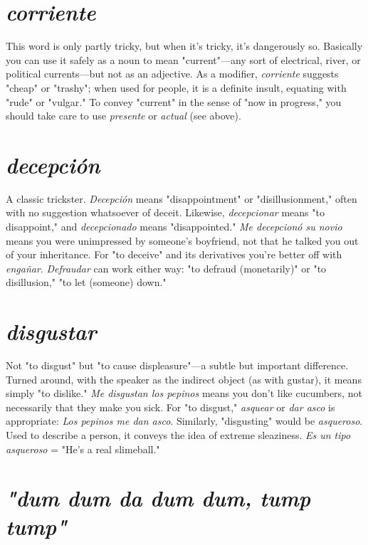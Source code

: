 \documentclass[14pt,a4paper,oneside]{memoir}
\begin{document}
\section{\emph{corriente}}

This word is only partly tricky, but when it's
tricky, it's dangerously so. Basically you can use it safely as a noun to
mean "current"---any sort of electrical, river, or political currents---but not as an adjective. As a modifier, \emph{corriente} suggests "cheap" or
"trashy"; when used for people, it is a definite insult, equating with
"rude" or "vulgar." To convey "current" in the sense of "now in progress," you should take care to use \emph{presente} or \emph{actual} (see above).

\section{\emph{decepción}}

A classic trickster. \emph{Decepción} means "disappointment" or "disillusionment," often with no suggestion whatsoever
of deceit. Likewise, \emph{decepcionar} means "to disappoint," and \emph{decepcionado} means "disappointed." \emph{Me decepcionó su novio} means you
were unimpressed by someone's boyfriend, not that he talked you out
of your inheritance. For "to deceive" and its derivatives you're better
off with \emph{engañar}. \emph{Defraudar} can work either way: "to defraud (monetarily)" or "to disillusion," "to let (someone) down."

\section{\emph{disgustar}}

Not "to disgust" but "to cause displeasure"---a
subtle but important difference. Turned around, with the speaker as
the indirect object (as with gustar), it means simply "to dislike." \emph{Me
	disgustan los pepinos} means you don't like cucumbers, not necessarily
that they make you sick. For "to disgust," \emph{asquear} or \emph{dar asco} is appropriate: \emph{Los pepinos me dan asco}. Similarly, "disgusting" would be
\emph{asqueroso}. Used to describe a person, it conveys the idea of extreme
sleaziness. \emph{Es un tipo asqueroso} = "He's a real slimeball."

\section{\emph{"dum dum da dum dum, tump tump"}}
\end{document}
